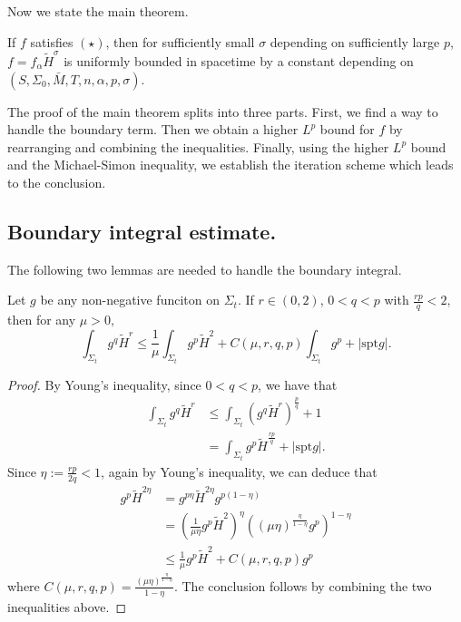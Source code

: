 Now we state the main theorem.

\begin{theorem} \label{stamit}
    If $f$ satisfies $(\star)$, then for sufficiently small $\sigma $ depending on sufficiently large $p$, $f=f_{\alpha }\tilde{H}^{\sigma }$ is uniformly bounded in spacetime by a constant depending on $(S,\Sigma _0,\bar{M},T,n,\alpha ,p,\sigma )$. 
\end{theorem}

The proof of the main theorem splits into three parts. First, we find a way to handle the boundary term. Then we obtain a higher $L^p$ bound for $f$ by rearranging and combining the inequalities. Finally, using the higher $L^p$ bound and the Michael-Simon inequality, we establish the iteration scheme which leads to the conclusion.

\subsection{Boundary integral estimate.}

The following two lemmas are needed to handle the boundary integral.

\begin{lemma}\label{HSquare}
    Let $g$ be any non-negative funciton on $\Sigma_t.$ If $r \in (0,2)$, $0<q<p$ with $\frac{rp }{q}<2,$ then for any $\mu >0,$ 
    \[
        \int_{\Sigma_t} g^q \tilde{H}^r \leq \frac{1}{\mu }\int_{\Sigma_t} g^p \tilde{H}^2+C(\mu ,r,q,p )\int_{\Sigma_t} g^p + \left| \mathrm{spt } g \right|.    
    \]
\end{lemma}
\begin{proof}
    By Young's inequality, since $0<q<p$, we have that 
    \begin{equation*}
    \begin{split}
        \int_{\Sigma_t} g^q \tilde{H}^r 
    &\leq \int_{\Sigma_t} (g^q \tilde{H}^r)^{\frac{p}{q}}+1  \\
    &= \int_{\Sigma_t} g^p \tilde{H}^{\frac{rp }{q}}+\left| \mathrm{spt } g \right|.
    \end{split}
    \end{equation*} 
    Since $\eta := \frac{rp }{2q}<1$, again by Young's inequality, we can deduce that
    \begin{equation*}
    \begin{split}
        g^p \tilde{H}^{2\eta} 
    &= g^{p \eta }\tilde{H}^{2\eta}g^{p \left( 1-\eta \right) } \\
    &= \left( \frac{1}{\mu \eta  }g^{p}\tilde{H}^2 \right) ^{\eta} \left( (\mu \eta )^{\frac{\eta}{1-\eta } }g^p\right)^{1-\eta }\\
    & \leq \frac{1}{\mu }g^p\tilde{H}^2+C(\mu ,r,q,p)g^p
    \end{split}
    \end{equation*} 
    where $C(\mu ,r,q,p)=\frac{(\mu \eta )^{\frac{\eta}{1-\eta } }}{1-\eta }$.
    The conclusion follows by combining the two inequalities above.
\end{proof}

